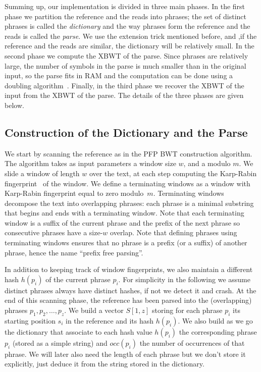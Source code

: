 Summing up, our implementation is divided in three main phases. In the first phase we partition the reference and the reads into phrases; the set of distinct phrases is called the {\em dictionary} and the way phrases form the reference and the reads is called the {\em parse}. We use the extension trick mentioned before, and ,if the reference and the reads are similar, the dictionary will be relatively small.   
In the second phase we compute the XBWT of the parse. Since phrases are relatively large, the number of symbols in the parse is much smaller than in the original input, so the parse fits in RAM and the computation can be done using a doubling algorithm~\cite{doubling_algorithm}. Finally, in the third phase we recover the XBWT of the input from the XBWT of the parse.  {The details of the three phases are given below.} 



\subsection{Construction of the Dictionary and the Parse}

We start by scanning the reference as in the PFP BWT construction algorithm. The algorithm takes as input parameters a window size $w$, and a modulo $m$. We slide a window of length $w$ over the text, at each step computing the Karp-Rabin fingerprint~\cite{KRfingerprint} of the window. We define a terminating windows as a window with Karp-Rabin fingerprint equal to zero modulo~$m$. Terminating windows decompose the text into overlapping phrases: each phrase is a minimal substring that begins and ends with a terminating window. Note that each terminating window is a suffix of the current phrase and the prefix of the next phrase so consecutive phrases have a size-$w$ overlap. Note that defining phrases using terminating windows ensures that no phrase is a prefix (or a suffix) of another phrase, hence the name ``prefix free parsing''.

In addition to keeping track of window fingerprints, we also maintain a different hash $h(p_i)$ of the current phrase $p_i$. For simplicity in the following we assume distinct phrases always have distinct hashes, if not we detect it and crash. At the end of this scanning phase, the reference has been parsed into the (overlapping) phrases $p_1,p_2,\dots,p_z$. We build a vector $S[1,z]$ storing for each phrase $p_i$ its starting position $s_i$ in the reference and its hash $h(p_i)$.  {We also build as we go the dictionary that associate to each hash value $h(p_i)$ the corresponding phrase $p_i$  (stored as a simple string) and $occ(p_i)$ the number of occurrences of that phrase. We will later also need the length of each phrase but we don't store it explicitly, just deduce it from the string stored in the dictionary.}

